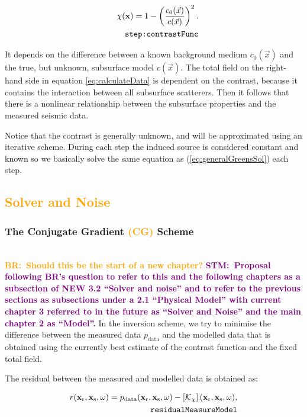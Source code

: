 \documentclass[10pt,a4paper]{article}
\newcommand{\commentstmtwo}[1]{\textcolor{purple}{\textbf{STM:\ #1}}}
\newcommand{\oldstmtwo}[1]{\xout{#1}}
\newcommand{\commentbr}[1]{\textcolor{orange}{\textbf{BR:\ #1}}}
\newcommand{\xs}{\mathbf{x}_\text{s}}
\newcommand{\xr}{\mathbf{x}_\text{r}}
\begin{document}
\begin{align} \label{eq:contrastFunc}\chi(\mathbf{x}) = 1 -
\left(\frac{c_0(\vec{x})}{c(\vec{x})} \right)^2.\\
\tag*{\texttt{step:contrastFunc}}
\end{align}

It depends on the difference between a known background medium
$c_\text{0}(\vec{x})$ and the true, but unknown, subsurface model
$c(\vec{x})$. The total field on the right-hand side in equation
\ref{eq:calculateData} is dependent on the contrast, because it contains the
interaction between all subsurface scatterers. Then it follows that
there is a nonlinear relationship between the subsurface properties
and the measured seismic data.

Notice that the contrast is generally unknown, and will be
approximated using an iterative scheme. During each step the induced
source is considered constant and known so we basically solve the same
equation as (\ref{eq:generalGreensSol}) each step.
\subsection{\textcolor{orange}{Solver and Noise}}
\subsubsection{The Conjugate Gradient \textcolor{orange}{(CG)} Scheme}
\label{conjgrad}
\oldstmtwo{\textbf{The Conjugate Gradient Scheme}}\\
\commentbr{Should this be the start of a new chapter?}
\commentstmtwo{Proposal following BR's question to refer to this and
the following chapters as a subsection of  NEW 3.2 ``Solver and noise'' and to refer to the previous sections as subsections under a
2.1 ``Physical Model'' with current chapter 3 referred to in the
future as ``Solver and Noise'' and the main chapter 2 as ``Model''.}
In the inversion scheme, we try to minimise the difference between the
measured data $p_\text{data}$ and the modelled data that is obtained
using the currently best estimate of the contrast function and the
fixed total field.

The residual between the measured and modelled data is obtained as:

\begin{align} \label{eq:residualMeasureModel} r(\xr, \xs, \omega) =
p_{\text{data}}(\xr, \xs, \omega) - \left[\mathcal{K}_\chi
\right](\xr, \xs, \omega),\\
\tag*{\texttt{residualMeasureModel}}
\end{align}
\end{document}
